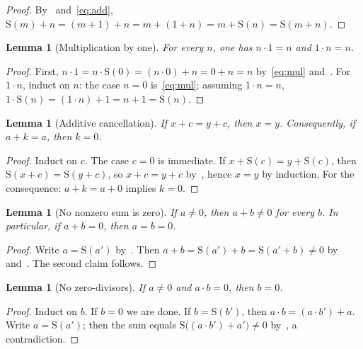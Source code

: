 \documentclass[11pt,reqno]{amsart}
\theoremstyle{plain}
\newtheorem{lemma}[theorem]{Lemma}
\theoremstyle{definition}
\theoremstyle{remark}
\newcommand{\Suc}{\mathrm{S}}
\numberwithin{equation}{section}
\begin{document}
\begin{proof}
By~ and~\eqref{eq:add},
\(\Suc(m)+n=(m+1)+n=m+(1+n)=m+\Suc(n)=\Suc(m+n)\).
\end{proof}

\begin{lemma}[Multiplication by one]
\label{lem:mul-one}
For every \(n\), one has \(n\cdot 1=n\) and \(1\cdot n=n\).
\end{lemma}

\begin{proof}
First,
\(n\cdot 1=n\cdot\Suc(0)=(n\cdot 0)+n=0+n=n\)
by~\eqref{eq:mul} and~. For \(1\cdot n\), induct on
\(n\): the case \(n=0\) is~\eqref{eq:mul}; assuming \(1\cdot n=n\),
\(1\cdot\Suc(n)=(1\cdot n)+1=n+1=\Suc(n)\).
\end{proof}

\begin{lemma}[Additive cancellation]
\label{lem:add-cancel}
If \(x+c=y+c\), then \(x=y\). Consequently, if \(a+k=a\), then \(k=0\).
\end{lemma}

\begin{proof}
Induct on \(c\). The case \(c=0\) is immediate. If
\(x+\Suc(c)=y+\Suc(c)\), then \(\Suc(x+c)=\Suc(y+c)\), so
\(x+c=y+c\) by~, hence \(x=y\) by induction. For the
consequence: \(a+k=a+0\) implies \(k=0\).
\end{proof}

\begin{lemma}[No nonzero sum is zero]
\label{lem:sum-ne-zero}
If \(a\neq 0\), then \(a+b\neq 0\) for every \(b\). In particular, if
\(a+b=0\), then \(a=b=0\).
\end{lemma}

\begin{proof}
Write \(a=\Suc(a')\) by~. Then
\(a+b=\Suc(a')+b=\Suc(a'+b)\neq 0\)
by~ and~. The second claim follows.
\end{proof}

\begin{lemma}[No zero-divisors]
\label{lem:no-zero-div}
If \(a\neq 0\) and \(a\cdot b=0\), then \(b=0\).
\end{lemma}

\begin{proof}
Induct on \(b\). If \(b=0\) we are done. If \(b=\Suc(b')\), then
\(a\cdot b=(a\cdot b')+a\). Write \(a=\Suc(a')\); then the sum equals
\(\Suc\bigl((a\cdot b')+a'\bigr)\neq 0\)
by~, a contradiction.
\end{proof}
\end{document}
